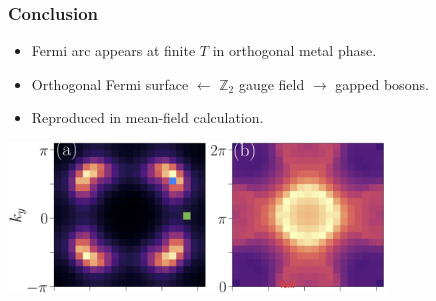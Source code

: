 \documentclass[xcolor=table, 10pt, aspectratio=43]{beamer}
\begin{document}
\begin{frame}
  \frametitle{Conclusion}
  \begin{itemize}
  \item Fermi arc appears at finite $T$ in orthogonal metal phase.
  \item Orthogonal Fermi surface $\leftarrow$ $\mathbb Z_2$ gauge field $\rightarrow$ gapped bosons.
  \item Reproduced in mean-field calculation.
  \end{itemize}
  \begin{center}
    \includegraphics[height=4cm]{fermi_arc}
  \end{center}
\end{frame}
\end{document}
